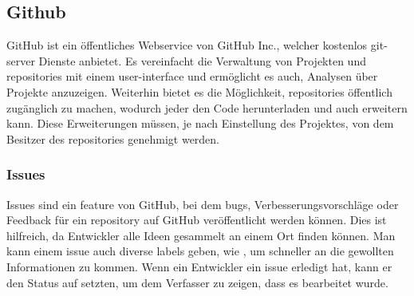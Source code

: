 \renewcommand{\kapitelautor}{Autor: Felix Zwickelstorfer}
\subsection{Github}\label{subsec:github}

GitHub ist ein öffentliches Webservice von GitHub Inc., welcher kostenlos git-server Dienste anbietet.
Es vereinfacht die Verwaltung von Projekten und repositories mit einem user-interface und ermöglicht es auch, Analysen über Projekte anzuzeigen.
Weiterhin bietet es die Möglichkeit, repositories öffentlich zugänglich zu machen, wodurch jeder den Code herunterladen und auch erweitern kann.
Diese Erweiterungen müssen, je nach Einstellung des Projektes, von dem Besitzer des repositories genehmigt werden.

\renewcommand{\kapitelautor}{Autor: Felix Zwickelstorfer}
\subsubsection{Issues}\label{subsubsec:issues}

Issues sind ein feature von GitHub, bei dem bugs, Verbesserungsvorschläge oder Feedback für ein repository auf GitHub veröffentlicht werden können.
Dies ist hilfreich, da Entwickler alle Ideen gesammelt an einem Ort finden können.
Man kann einem issue auch diverse labels geben, wie \zB {}, um schneller an die gewollten Informationen zu kommen.
Wenn ein Entwickler ein issue erledigt hat, kann er den Status auf  setzten, um dem Verfasser zu zeigen, dass es bearbeitet wurde.